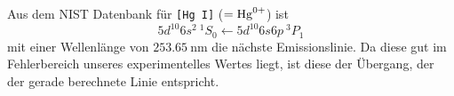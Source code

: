 	Aus dem NIST Datenbank \citep{NIST_ASD} für \texttt{[Hg I]} ($= \ce{Hg^{0+}}$) ist $$5d^{10}6s^2~^1\!S_0 \leftarrow 5d^{10}6s6p~^3\!P_1$$ mit einer Wellenlänge von $\SI{253.65}{\nano\meter}$ die nächste Emissionslinie. Da diese gut im Fehlerbereich unseres experimentelles Wertes liegt, ist diese der Übergang, der der gerade berechnete Linie entspricht. 

